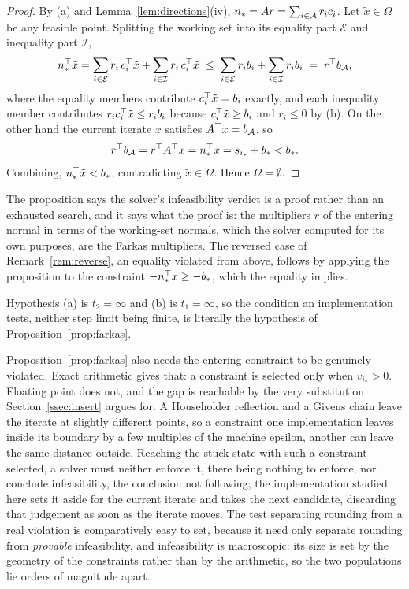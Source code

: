 \begin{proof}
By (a) and Lemma~\ref{lem:directions}(iv), $n_* = A r = \sum_{i \in \mathcal{A}} r_i
c_i$. Let $\tilde x \in \Omega$ be any feasible point. Splitting the working set
into its equality part $\mathcal{E}$ and inequality part $\mathcal{I}$,
\[
  n_*^{\top} \tilde x
  = \sum_{i \in \mathcal{E}} r_i\, c_i^{\top} \tilde x
    + \sum_{i \in \mathcal{I}} r_i\, c_i^{\top} \tilde x
  \;\le\; \sum_{i \in \mathcal{E}} r_i b_i + \sum_{i \in \mathcal{I}} r_i b_i
  \;=\; r^{\top} b_{\mathcal{A}} ,
\]
where the equality members contribute $c_i^{\top}\tilde x = b_i$ exactly, and each
inequality member contributes $r_i c_i^{\top} \tilde x \le r_i b_i$ because
$c_i^{\top}\tilde x \ge b_i$ and $r_i \le 0$ by (b). On the other hand the current
iterate $x$ satisfies $A^{\top} x = b_{\mathcal{A}}$, so
\[
  r^{\top} b_{\mathcal{A}} = r^{\top} A^{\top} x = n_*^{\top} x = s_{i_*} + b_* < b_* .
\]
Combining, $n_*^{\top}\tilde x < b_*$, contradicting $\tilde x \in \Omega$. Hence
$\Omega = \emptyset$.
\end{proof}

The proposition says the solver's infeasibility verdict is a proof rather than an
exhausted search, and it says what the proof is: the multipliers $r$ of the
entering normal in terms of the working-set normals, which the solver computed for
its own purposes, are the Farkas multipliers. The reversed case of
Remark~\ref{rem:reverse}, an equality violated from above, follows by
applying the proposition to the constraint $-n_*^{\top} x \ge -b_*$, which the equality
implies.

Hypothesis (a) is $t_2 = \infty$ and (b) is $t_1 = \infty$, so the condition an
implementation tests, neither step limit being finite, is literally the hypothesis
of Proposition~\ref{prop:farkas}.

\begin{remark}
\label{rem:spurious}
Proposition~\ref{prop:farkas} also needs the entering constraint to be genuinely
violated. Exact arithmetic gives that: a constraint is selected only when
$v_{i_*} > 0$. Floating point does not, and the gap is reachable by the very
substitution Section~\ref{ssec:insert} argues for. A Householder reflection and
a Givens chain leave the iterate at slightly different points, so a constraint one
implementation leaves inside its boundary by a few multiples of the machine
epsilon, another can leave the same distance outside. Reaching the stuck state with
such a constraint selected, a solver must neither enforce it, there being nothing
to enforce, nor conclude infeasibility, the conclusion not following; the
implementation studied here sets it aside for the current iterate and takes the
next candidate, discarding that judgement as soon as the iterate moves. The test
separating rounding from a real violation is comparatively easy to set, because it
need only separate rounding from \emph{provable} infeasibility, and infeasibility
is macroscopic: its size is set by the geometry of the constraints rather than by
the arithmetic, so the two populations lie orders of magnitude apart.
\end{remark}
